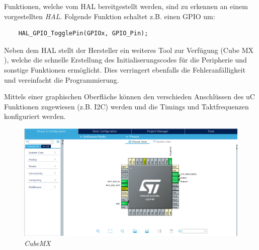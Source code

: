\smallskip

Funktionen, welche vom \ac{HAL} bereitgestellt werden, sind zu erkennen an einem vorgestellten \textit{HAL}. Folgende Funktion schaltet z.B. einen \ac{GPIO} um:

\smallskip

\begin{lstlisting}
    HAL_GPIO_TogglePin(GPIOx, GPIO_Pin);
\end{lstlisting}

\smallskip

Neben dem \ac{HAL} stellt der Hersteller ein weiteres Tool zur Verfügung (Cube MX \citep{CubeMX}), welche die schnelle Erstellung des Initialiserungscodes 
für die Peripherie und sonstige Funktionen ermöglicht. Dies verringert ebenfalls die Fehleranfälligkeit und vereinfacht die Programmierung.

Mittels einer graphischen Oberfläche können den verschieden Anschlüssen des \ac{uC} Funktionen zugewiesen (z.B. \ac{I2C}) werden und die Timings und Taktfrequenzen
konfiguriert werden.

\vspace{0.5cm}

\begin{figure}[h]
    \vspace{-\baselineskip}
        \centering
        \includegraphics[scale=0.3]{Pictures/cubeMX.png}
        \caption{\textit{CubeMX}}
        \label{img:CubeMX}
\end{figure}